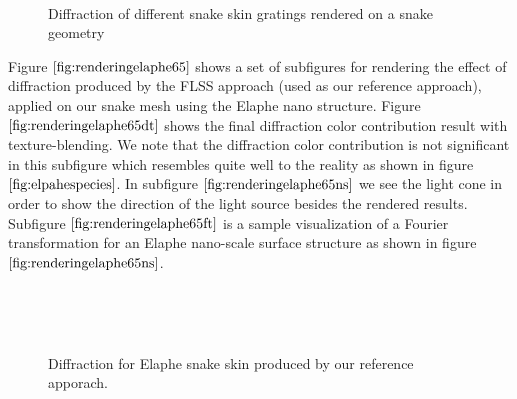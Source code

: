 \begin{figure}[H]
  \centering
~
~
  
\caption[Snake Renderings: Our Approaches applied on our Gratings]{Diffraction of different snake skin gratings rendered on a snake geometry}
\label{fig:renderingdifferentsnankegratings}
\end{figure}

Figure $\ref{fig:renderingelaphe65}$ shows a set of subfigures for rendering the effect of diffraction produced by the FLSS approach (used as our reference approach), applied on our snake mesh using the Elaphe nano structure. Figure $\ref{fig:renderingelaphe65dt}$ shows the final diffraction color contribution result with texture-blending. We note that the diffraction color contribution is not significant in this subfigure which resembles quite well to the reality as shown in figure $\ref{fig:elpahespecies}$. In subfigure $\ref{fig:renderingelaphe65ns}$ we see the light cone in order to show the direction of the light source besides the rendered results. Subfigure $\ref{fig:renderingelaphe65ft}$ is a sample visualization of a Fourier transformation for an Elaphe nano-scale surface structure as shown in figure $\ref{fig:renderingelaphe65ns}$.

\begin{figure}[H]
  \centering
~

~
~ 
  
\caption[Snake Renderings: FLSS Approach for Elaphe Grating]{Diffraction for Elaphe snake skin produced by our reference apporach.}
\label{fig:renderingelaphe65}
\end{figure}


